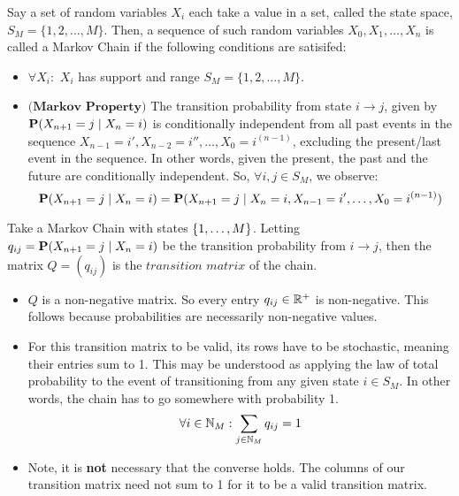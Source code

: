 \begin{definition} Say a set of random variables $X_i$ each take a value in a set, called the state space, $S_M = \{1,2,\dots,M\}$. Then, a sequence of such random variables $X_0,X_1,\dots,X_n$ is called a Markov Chain if the following conditions are satisifed:
\end{definition}

\begin{itemize}
\item $\forall X_i:$ $X_i$ has support and range $S_M = \{1,2,...,M\}$.
\item $\textbf{(Markov Property)}$ The transition probability from state $i \to j$, given by $\Prb(X_{n+1} = j \mid X_n = i)$ is conditionally independent from all past events in the sequence $X_{n-1} = i',X_{n-2} = i'', \dots,X_0 = i^{(n-1)}$, excluding the present/last event in the sequence. In other words, given the present, the past and the future are conditionally independent. So, $\forall i,j \in S_M$, we observe:
$$ \Prb(X_{n+1} = j \mid X_n = i) = \Prb(X_{n+1} = j \mid X_n = i, X_{n-1} = i', \dots,X_0 = i^{(n-1)})$$
\end{itemize}


\begin{definition}
Take a Markov Chain with states $\{\oneto[M]\}$. Letting $q_{ij} = \P(X_{n+1} = j \mid X_n = i)$ be the transition probability from $i \to j$, then the matrix $Q=(q_{ij})$ is the $\textit{transition matrix}$ of the chain.
\end{definition}

\begin{itemize}
\item $Q$ is a non-negative matrix. So every entry $q_{ij} \in \R^+$ is non-negative. This follows because probabilities are necessarily non-negative values.
\item For this transition matrix to be valid, its rows have to be stochastic, meaning their entries sum to 1. This may be understood as applying the law of total probability to the event of transitioning from any given state $i \in S_M$. In other words, the chain has to go somewhere with probability 1.
$$\forall i \in \N_M: \sum_{j \in \N_M} q_{ij} = 1$$
\item Note, it is \textbf{not} necessary that the converse holds. The columns of our transition matrix need not sum to 1 for it to be a valid transition matrix.
\end{itemize}

